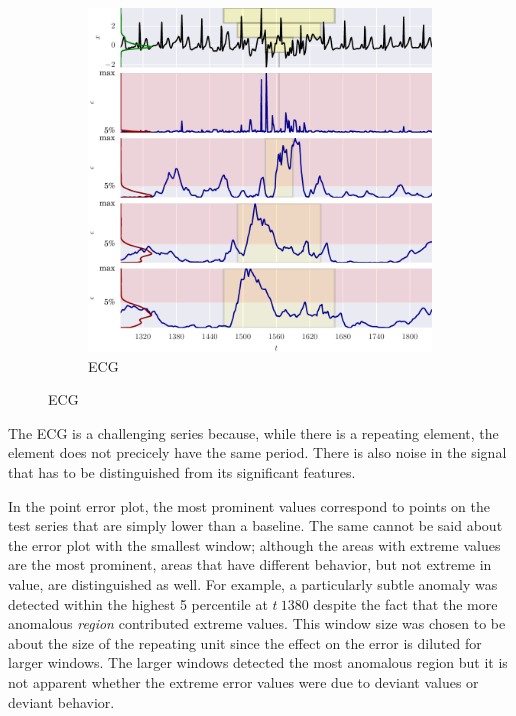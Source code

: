 \begin{figure}[!hp]
    \ContinuedFloat 

    \begin{subfigure}[t]{\textwidth} 
        \centering
        \includegraphics[]{figs/er_ecg.pdf}
        \caption{ECG}
    \end{subfigure}%

\end{figure}


The ECG is a challenging series because, while there is a repeating element, the element does not precicely have the same period.
%
There is also noise in the signal that has to be distinguished from its significant features.

In the point error plot, the most prominent values correspond to points on the test series that are simply lower than a baseline.
%
The same cannot be said about the error plot with the smallest window;
%
although the areas with extreme values are the most prominent, areas that have different behavior, but not extreme in value, are distinguished as well.
%
For example, a particularly subtle anomaly was detected within the highest 5 percentile at $t~1380$ despite the fact that the more anomalous \emph{region} contributed extreme values.
%
This window size was chosen to be about the size of the repeating unit since the effect on the error is diluted for larger windows.
%
The larger windows detected the most anomalous region but it is not apparent whether the extreme error values were due to deviant values or deviant behavior.


